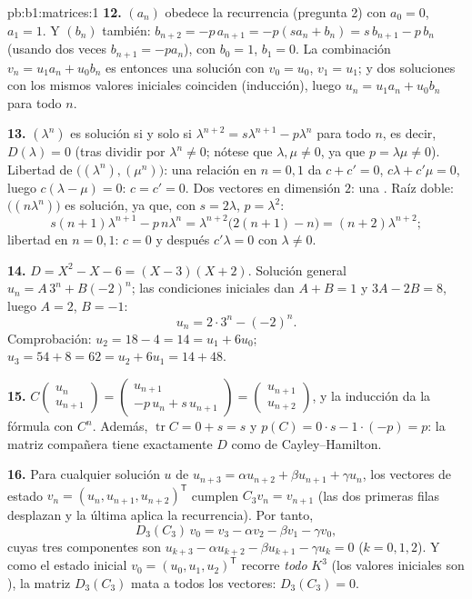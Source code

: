 \begin{solution}{pb:b1:matrices:1}
\textbf{12.} $(a_n)$ obedece la recurrencia (pregunta 2) con
$a_0 = 0$, $a_1 = 1$. Y $(b_n)$ también:
$b_{n+2} = -p\,a_{n+1} = -p(s a_n + b_n) = s\,b_{n+1} - p\,b_n$
(usando dos veces $b_{n+1} = -pa_n$), con $b_0 = 1$, $b_1 = 0$. La
combinación $v_n = u_1 a_n + u_0 b_n$ es entonces una solución con
$v_0 = u_0$, $v_1 = u_1$; y dos soluciones con los mismos valores
iniciales coinciden (inducción), luego $u_n = u_1 a_n + u_0 b_n$ para
todo $n$.

\textbf{13.} $(\lambda^n)$ es solución si y solo si
$\lambda^{n+2} = s\lambda^{n+1} - p\lambda^n$ para todo $n$, es
decir, $D(\lambda) = 0$ (tras dividir por $\lambda^n \neq 0$;
nótese que $\lambda, \mu \neq 0$, ya que $p = \lambda\mu \neq 0$).
Libertad de $\bigl((\lambda^n), (\mu^n)\bigr)$: una relación en
$n = 0, 1$ da $c + c' = 0$, $c\lambda + c'\mu = 0$, luego
$c(\lambda - \mu) = 0$: $c = c' = 0$. Dos vectores  en
dimensión $2$: una .
Raíz doble: $\bigl((n\lambda^n)\bigr)$ es solución, ya que, con
$s = 2\lambda$, $p = \lambda^2$:
\[
s(n+1)\lambda^{n+1} - p\,n\lambda^n
= \lambda^{n+2}\bigl(2(n+1) - n\bigr) = (n+2)\lambda^{n+2} ;
\]
libertad en $n = 0, 1$: $c = 0$ y después $c'\lambda = 0$ con
$\lambda \neq 0$.

\textbf{14.} $D = X^2 - X - 6 = (X - 3)(X + 2)$. Solución general
$u_n = A\,3^n + B(-2)^n$; las condiciones iniciales dan $A + B = 1$ y
$3A - 2B = 8$, luego $A = 2$, $B = -1$:
\[
u_n = 2\cdot 3^n - (-2)^n .
\]
Comprobación: $u_2 = 18 - 4 = 14 = u_1 + 6u_0$;
$u_3 = 54 + 8 = 62 = u_2 + 6u_1 = 14 + 48$.

\textbf{15.}
$C\begin{pmatrix} u_n\\ u_{n+1}\end{pmatrix} =
\begin{pmatrix} u_{n+1}\\ -p\,u_n + s\,u_{n+1}\end{pmatrix} =
\begin{pmatrix} u_{n+1}\\ u_{n+2}\end{pmatrix}$, y la inducción da la
fórmula con $C^n$. Además, $\operatorname{tr} C = 0 + s = s$ y
$p(C) = 0\cdot s - 1\cdot(-p) = p$: la matriz compañera tiene
exactamente $D$ como  de Cayley--Hamilton.

\textbf{16.} Para cualquier solución $u$ de
$u_{n+3} = \alpha u_{n+2} + \beta u_{n+1} + \gamma u_n$, los vectores
de estado $v_n = (u_n, u_{n+1}, u_{n+2})^{\mathsf T}$ cumplen
$C_3 v_n = v_{n+1}$ (las dos primeras filas desplazan y la última
aplica la recurrencia). Por tanto,
\[
D_3(C_3)\,v_0 = v_3 - \alpha v_2 - \beta v_1 - \gamma v_0 ,
\]
cuyas tres componentes son
$u_{k+3} - \alpha u_{k+2} - \beta u_{k+1} - \gamma u_k = 0$
($k = 0, 1, 2$). Y como el estado inicial
$v_0 = (u_0, u_1, u_2)^{\mathsf T}$ recorre \emph{todo} $K^3$ (los
valores iniciales son ), la matriz $D_3(C_3)$ mata a todos los
vectores: $D_3(C_3) = 0$.


\end{solution}
